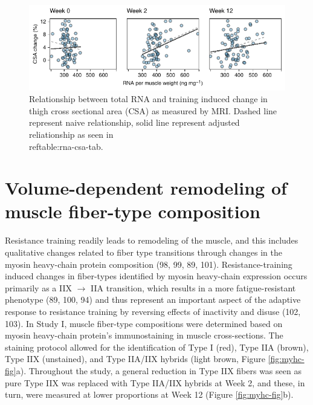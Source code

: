 \documentclass[twoside,10pt]{gihclass} %
\begin{document}
\begin{figure}

{\centering \includegraphics{thesis_files/figure-latex/rrna-csa-fig-1} 

}

\caption[Relationship between total RNA and training induced muscle growth]{Relationship between total RNA and training induced change in thigh cross sectional area (CSA) as measured by MRI. Dashed line represent naive relationship, solid line represent adjusted reliationship as seen in \\ref{table:rna-csa-tab}.}\label{fig:rrna-csa-fig}
\end{figure}
\hypertarget{volume-dependent-remodeling-of-muscle-fiber-type-composition}{%
\section{Volume-dependent remodeling of muscle fiber-type composition}\label{volume-dependent-remodeling-of-muscle-fiber-type-composition}}

Resistance training readily leads to remodeling of the muscle, and this includes qualitative changes related to fiber type transitions through changes in the myosin heavy-chain protein composition
(98, 99, 89, 101).
Resistance-training induced changes in fiber-types identified by myosin heavy-chain expression occurs primarily as a IIX \(\rightarrow\) IIA transition, which results in a more fatigue-resistant phenotype
(89, 100, 94)
and thus represent an important aspect of the adaptive response to resistance training by reversing effects of inactivity and disuse
(102, 103).
In Study I, muscle fiber-type compositions were determined based on myosin heavy-chain protein's immunostaining in muscle cross-sections. The staining protocol allowed for the identification of Type I (red), Type IIA (brown), Type IIX (unstained), and Type IIA/IIX hybrids (light brown, Figure \ref{fig:myhc-fig}a). Throughout the study, a general reduction in Type IIX fibers was seen as pure Type IIX was replaced with Type IIA/IIX hybrids at Week 2, and these, in turn, were measured at lower proportions at Week 12 (Figure \ref{fig:myhc-fig}b).
\end{document}
